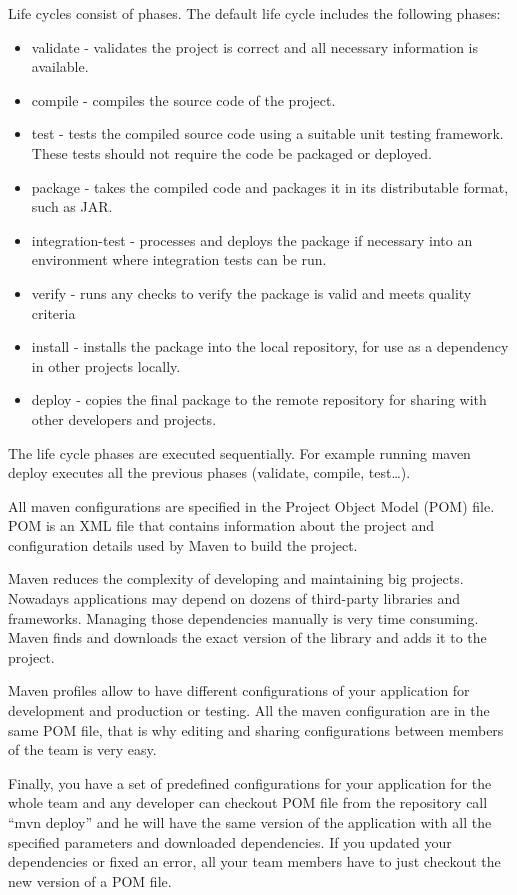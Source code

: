   Life cycles  consist of phases.  The default life cycle includes the following phases:
  \begin{itemize}
    \item validate - validates the project is correct and all necessary
    information is available.
    \item compile - compiles the source code of the project.
    \item test - tests the compiled source code using a suitable unit testing
    framework. These tests should not require the code be packaged or deployed.
    \item package - takes the compiled code and packages it in its distributable
    format, such as JAR.
    \item integration-test - processes and deploys the package if necessary into
    an environment where integration tests can be run.
    \item verify - runs any checks to verify the package is valid and meets quality criteria
    \item install - installs the package into the local repository, for use as a
      dependency in other projects locally.
    \item  deploy - copies the final package to the remote repository for
    sharing with other developers and projects.
  \end{itemize}
  
  The life cycle phases are executed sequentially. For  example 
  running maven deploy executes all the  previous phases (validate, compile,
  test\ldots).
  
  All maven configurations are specified in the Project Object Model (POM) file.
  POM is an XML file that contains information about the project and configuration details used by Maven 
  to build the project. 

  Maven reduces the complexity of developing and maintaining big projects.
  Nowadays applications may depend on dozens of third-party libraries and
  frameworks. Managing those dependencies manually is very time consuming. Maven
  finds  and downloads the exact version of the library and adds it to the
  project.
  
   Maven profiles allow to have different configurations of your
  application for development and production or testing. All the maven
  configuration are in the same POM file, that is why editing and sharing
  configurations between members of the team is very easy. 

  Finally, you have a set of predefined configurations for your application
  for the whole team and any developer can checkout POM file from the repository
  call ``mvn deploy'' and he will have the same version of the application with all
  the specified parameters and downloaded dependencies. If you updated
  your dependencies or fixed an error, all your team members
  have to just checkout the new version of a POM file.
 

